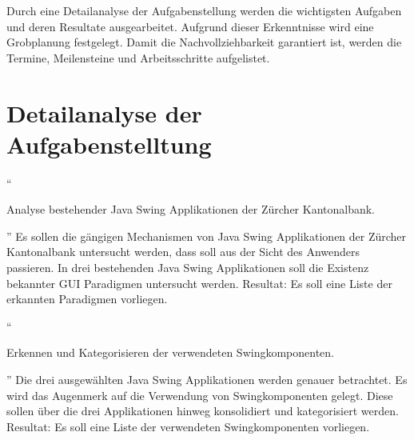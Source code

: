   Durch eine Detailanalyse der Aufgabenstellung werden die wichtigsten
  Aufgaben und deren Resultate ausgearbeitet. Aufgrund dieser Erkenntnisse
  wird eine Grobplanung festgelegt. Damit die Nachvollziehbarkeit garantiert
  ist, werden die Termine, Meilensteine und Arbeitsschritte aufgelistet.
  
  \section{Detailanalyse der Aufgabenstelltung}
  
  \indent
  \indent
  ``\begin{itshape}Analyse bestehender Java Swing Applikationen der Zürcher
  Kantonalbank.\end{itshape}''
  \newline
  \newline
  \noindent
  Es sollen die gängigen Mechanismen von Java Swing Applikationen der Zürcher
  Kantonalbank untersucht werden, dass soll aus der Sicht des Anwenders
  passieren. In drei bestehenden Java Swing Applikationen soll die Existenz
  bekannter GUI Paradigmen untersucht werden.
  \newline
  \newline
  \noindent
  Resultat: Es soll eine Liste der erkannten Paradigmen vorliegen.
  \newline
  
  ``\begin{itshape}Erkennen und Kategorisieren der verwendeten
  Swingkomponenten.\end{itshape}''
  \newline
  \newline
  \noindent
  Die drei ausgewählten Java Swing Applikationen werden genauer betrachtet. Es
  wird das Augenmerk auf die Verwendung von Swingkomponenten gelegt. Diese
  sollen über die drei Applikationen hinweg konsolidiert und kategorisiert
  werden.
  \newline
  \newline
  \noindent
  Resultat: Es soll eine Liste der verwendeten Swingkomponenten vorliegen.
  \newline
  
